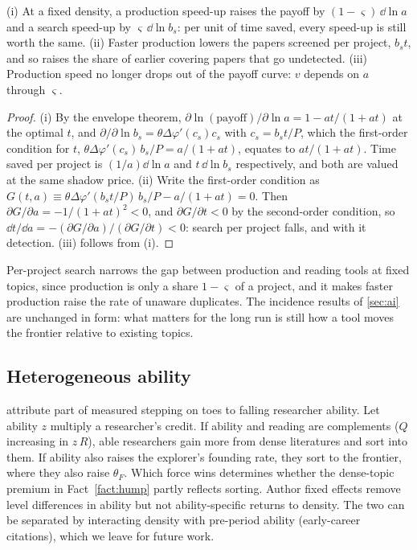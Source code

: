\begin{proposition}\label{prop:perproject}
(i) At a fixed density, a production speed-up raises the payoff by $(1-\varsigma)\,\dd\ln a$ and a search speed-up by $\varsigma\,\dd\ln b_s$: per unit of time saved, every speed-up is still worth the same.
(ii) Faster production lowers the papers screened per project, $b_st$, and so raises the share of earlier covering papers that go undetected.
(iii) Production speed no longer drops out of the payoff curve: $v$ depends on $a$ through $\varsigma$.
\end{proposition}
\begin{proof}
(i) By the envelope theorem, $\partial\ln(\text{payoff})/\partial\ln a=1-at/(1+at)$
at the optimal $t$, and $\partial/\partial\ln b_s=\theta\Delta\varphi'(c_s)c_s$ with
$c_s=b_st/P$, which the first-order condition for $t$,
$\theta\Delta\varphi'(c_s)\,b_s/P=a/(1+at)$, equates to $at/(1+at)$. Time saved per
project is $(1/a)\dd\ln a$ and $t\,\dd\ln b_s$ respectively, and both are valued
at the same shadow price. (ii) Write the first-order condition as
$G(t,a)\equiv\theta\Delta\varphi'(b_st/P)\,b_s/P-a/(1+at)=0$. Then
$\partial G/\partial a=-1/(1+at)^2<0$, and $\partial G/\partial t<0$ by the
second-order condition, so $\dd t/\dd a=-(\partial G/\partial a)/(\partial G/\partial t)<0$:
search per project falls, and with it detection. (iii) follows from (i).
\end{proof}

Per-project search narrows the gap between production and reading tools at
fixed topics, since production is only a share $1-\varsigma$ of a project, and it
makes faster production raise the rate of unaware duplicates. The incidence
results of \cref{sec:ai} are unchanged in form: what matters for the long run
is still how a tool moves the frontier relative to existing topics.

\subsection{Heterogeneous ability}

\citet{ekerdtwu2024} attribute part of measured stepping on toes to falling
researcher ability. Let ability $z$ multiply a researcher's credit. If ability
and reading are complements ($Q$ increasing in $z\,R$), able researchers gain
more from dense literatures and sort into them. If ability also raises the
explorer's founding rate, they sort to the frontier, where they also raise
$\theta_F$. Which force wins determines whether the dense-topic premium in
Fact~\ref{fact:hump} partly reflects sorting. Author fixed effects remove level
differences in ability but not ability-specific returns to density. The two
can be separated by interacting density with pre-period ability (early-career
citations), which we leave for future work.


